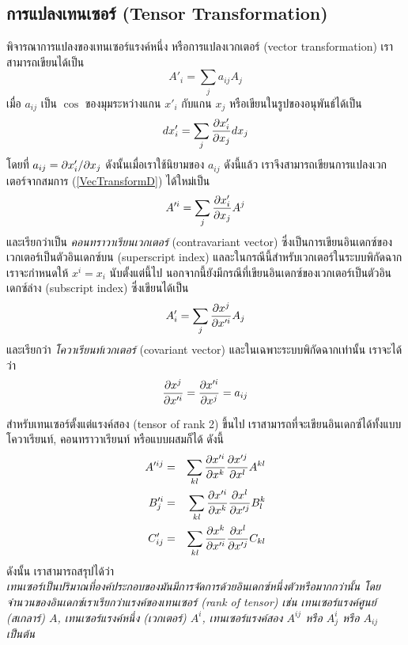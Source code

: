 \subsection{การแปลงเทนเซอร์ (Tensor Transformation)}
พิจารณาการแปลงของเทนเซอร์แรงค์หนึ่ง หรือการแปลงเวกเตอร์ (vector transformation) เราสามารถเขียนได้เป็น
\begin{equation}\label{VecTransformD}
A'_i = \sum_j a_{ij}A_j
\end{equation}
เมื่อ $a_{ij}$ เป็น $\cos$ ของมุมระหว่างแกน $x'_i$ กับแกน $x_j$ หรือเขียนในรูปของอนุพันธ์ได้เป็น
\begin{equation}\label{VecTransformDiff}
dx'_i = \sum_j \frac{\partial x'_i}{\partial x_j}dx_j
\end{equation}
โดยที่ $a_{ij} = \partial x'_i/\partial x_j$ ดังนั้นเมื่อเราใช้นิยามของ $a_{ij}$ ดังนี้แล้ว เราจึงสามารถเขียนการแปลงเวกเตอร์จากสมการ (\ref{VecTransformD}) ได้ใหม่เป็น
\begin{equation}\label{VecTransformConV}
A'^i = \sum_j \frac{\partial x'_i}{\partial x_j}A^j
\end{equation}
และเรียกว่าเป็น \emph{คอนทราวาเรียนเวกเตอร์} (contravariant vector) ซึ่งเป็นการเขียนอินเดกซ์ของเวกเตอร์เป็นตัวอินเดกซ์บน (superscript index) แลละในกรณีนี้สำหรับเวกเตอร์ในระบบพิกัดฉาก เราจะกำหนดให้ $x^i = x_i$ นับตั้งแต่นี้ไป นอกจากนี้ยังมีกรณีที่เขียนอินเดกซ์ของเวกเตอร์เป็นตัวอินเดกซ์ล่าง (subscript index) ซึ่งเขียนได้เป็น
\begin{equation}\label{VecTransformCoV}
A'_i = \sum_j \frac{\partial x^j}{\partial x'^i}A_j
\end{equation}
และเรียกว่า \emph{โควาเรียนท์เวกเตอร์} (covariant vector) และในเฉพาะระบบพิกัดฉากเท่านั้น เราจะได้ว่า
\begin{equation}\label{TransformCoeff}
\frac{\partial x^j}{\partial x'^i} = \frac{\partial x'^i}{\partial x^j} = a_{ij}
\end{equation}

สำหรับเทนเซอร์ตั้งแต่แรงค์สอง (tensor of rank 2) ขึ้นไป เราสามารถที่จะเขียนอินเดกซ์ได้ทั้งแบบโควาเรียนท์, คอนทราวาเรียนท์ หรือแบบผสมก็ได้ ดังนี้
\begin{eqnarray}\label{TensorTransformR2}
A'^{ij} &=& \sum_{kl}\frac{\partial x'^i}{\partial x^k}\frac{\partial x'^j}{\partial x^l}A^{kl} \nonumber \\
B'^i_j &=& \sum_{kl}\frac{\partial x'^i}{\partial x^k}\frac{\partial x^l}{\partial x'^j}B^k_l \\
C'_{ij} &=& \sum_{kl}\frac{\partial x^k}{\partial x'^i}\frac{\partial x^l}{\partial x'^j}C_{kl} \nonumber
\end{eqnarray}
ดังนั้น เราสามารถสรุปได้ว่า \\
\emph{เทนเซอร์เป็นปริมาณที่องค์ประกอบของมันมีการจัดการด้วยอินเดกซ์หนึ่งตัวหรือมากกว่านั้น โดยจำนวนของอินเดกซ์เราเรียกว่าแรงค์ของเทนเซอร์ (rank of tensor) เช่น เทนเซอร์แรงค์ศูนย์ (สเกลาร์) $A$, เทนเซอร์แรงค์หนึ่ง (เวกเตอร์) $A^i$, เทนเซอร์แรงค์สอง $A^{ij}$ หรือ $A^i_j$ หรือ $A_{ij}$ เป็นต้น}


